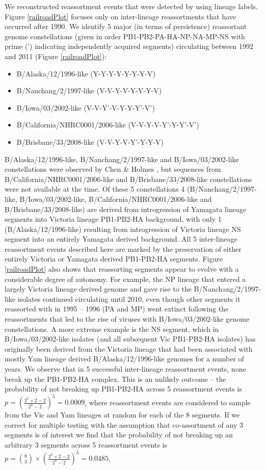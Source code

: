 \documentclass[11pt,oneside,letterpaper]{article}
\begin{document}
We reconstructed reassortment events that were detected by using lineage labels.
Figure \ref{railroadPlot} focuses only on inter-lineage reassortments that have occurred after 1990.
We identify 5 major (in terms of persistence) reassortant genome constellations (given in order PB1-PB2-PA-HA-NP-NA-MP-NS with prime (') indicating independently acquired segments) circulating between 1992 and 2011 (Figure \ref{railroadPlot}):
\begin{itemize}
  \item B/Alaska/12/1996-like (Y-Y-Y-Y-Y-Y-Y-V)
  \item B/Nanchang/2/1997-like (V-V-Y-V-Y-V-Y-V)
  \item B/Iowa/03/2002-like (V-V-Y'-V-Y-Y-Y'-V')
  \item B/California/NHRC0001/2006-like (V-V-Y-V-Y'-Y-Y'-V')
  \item B/Brisbane/33/2008-like (V-V-Y-V-Y'-Y-Y-V)
\end{itemize}
B/Alaska/12/1996-like, B/Nanchang/2/1997-like and B/Iowa/03/2002-like constellations were observed by Chen \& Holmes \citep{chen2008}, but sequences from \\B/California/NHRC0001/2006-like and B/Brisbane/33/2008-like constellations were not available at the time.
Of these 5 constellations 4 (B/Nanchang/2/1997-like, B/Iowa/03/2002-like, B/California/NHRC0001/2006-like and B/Brisbane/33/2008-like) are derived from introgression of Yamagata lineage segments into Victoria lineage PB1-PB2-HA background, with only 1 (B/Alaska/12/1996-like) resulting from introgression of Victoria lineage NS segment into an entirely Yamagata derived background.
All 5 inter-lineage reassortment events described here are marked by the preservation of either entirely Victoria or Yamagata derived PB1-PB2-HA segments.
Figure \ref{railroadPlot} also shows that reassorting segments appear to evolve with a considerable degree of autonomy.
For example, the NP lineage that entered a largely Victoria lineage derived genome and gave rise to the B/Nanchang/2/1997-like isolates continued circulating until 2010, even though other segments it reassorted with in 1995 -- 1996 (PA and MP) went extinct following the reassortments that led to the rise of viruses with B/Iowa/03/2002-like genome constellations.
A more extreme example is the NS segment, which in B/Iowa/03/2002-like isolates (and all subsequent Vic PB1-PB2-HA isolates) has originally been derived from the Victoria lineage that had been associated with mostly Yam lineage derived B/Alaska/12/1996-like genomes for a number of years.
We observe that in 5 successful inter-lineage reassortment events, none break up the PB1-PB2-HA complex.
This is an unlikely outcome -- the probability of not breaking up PB1-PB2-HA across 5 reassortment events is $p = (\frac{2^{5} \times 2 - 2}{2^{8} - 2})^{5} = 0.0009$, where reassortment events are considered to sample from the Vic and Yam lineages at random for each of the 8 segments.
If we correct for multiple testing with the assumption that co-assortment of any 3 segments is of interest we find that the probability of not breaking up an arbitrary 3 segments across 5 reassortment events is $p = \binom{8}{3} \times (\frac{2^{5} \times 2 - 2}{2^{8} - 2})^{5} = 0.0485$.
\end{document}

